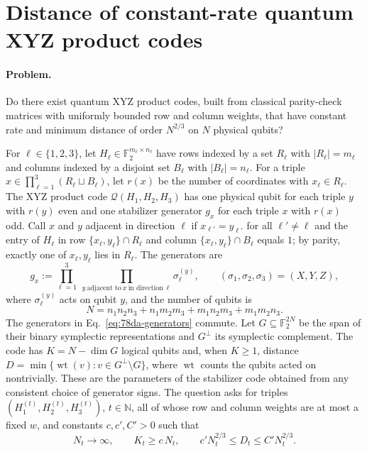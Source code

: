 \section{Distance of constant-rate quantum XYZ product codes}
\label{sec:op_78da2d4fc0735323}

\paragraph{Problem.}
Do there exist quantum XYZ product codes, built from classical parity-check matrices with uniformly bounded row and column weights, that have constant rate and minimum distance of order $N^{2/3}$ on $N$ physical qubits?

For $\ell\in\{1,2,3\}$, let $H_\ell\in\mathbb F_2^{m_\ell\times n_\ell}$ have rows indexed by a set $R_\ell$ with $|R_\ell|=m_\ell$ and columns indexed by a disjoint set $B_\ell$ with $|B_\ell|=n_\ell$. For a triple $x\in\prod_{\ell=1}^{3}(R_\ell\sqcup B_\ell)$, let $r(x)$ be the number of coordinates with $x_\ell\in R_\ell$. The XYZ product code $\mathcal Q(H_1,H_2,H_3)$ has one physical qubit for each triple $y$ with $r(y)$ even and one stabilizer generator $g_x$ for each triple $x$ with $r(x)$ odd. Call $x$ and $y$ adjacent in direction $\ell$ if $x_{\ell'}=y_{\ell'}$ for all $\ell'\neq\ell$ and the entry of $H_\ell$ in row $\{x_\ell,y_\ell\}\cap R_\ell$ and column $\{x_\ell,y_\ell\}\cap B_\ell$ equals $1$; by parity, exactly one of $x_\ell,y_\ell$ lies in $R_\ell$. The generators are
\begin{equation}
  g_x:=\prod_{\ell=1}^{3}\ \prod_{y\ \text{adjacent to}\ x\ \text{in direction}\ \ell}\sigma_\ell^{(y)},
  \qquad(\sigma_1,\sigma_2,\sigma_3)=(X,Y,Z),
  \label{eq:78da-generators}
\end{equation}
where $\sigma_\ell^{(y)}$ acts on qubit $y$, and the number of qubits is
\begin{equation}
  N=n_1n_2n_3+n_1m_2m_3+m_1n_2m_3+m_1m_2n_3.
  \label{eq:78da-qubits}
\end{equation}
The generators in Eq.~\eqref{eq:78da-generators} commute. Let $G\subseteq\mathbb F_2^{2N}$ be the span of their binary symplectic representations and $G^{\perp}$ its symplectic complement. The code has $K=N-\dim G$ logical qubits and, when $K\geq1$, distance $D=\min\{\operatorname{wt}(v):v\in G^{\perp}\setminus G\}$, where $\operatorname{wt}$ counts the qubits acted on nontrivially. These are the parameters of the stabilizer code obtained from any consistent choice of generator signs. The question asks for triples $(H_1^{(t)},H_2^{(t)},H_3^{(t)})$, $t\in\mathbb N$, all of whose row and column weights are at most a fixed $w$, and constants $c,c',C'>0$ such that
\begin{equation}
  N_t\to\infty,\qquad K_t\geq c\,N_t,\qquad c'N_t^{2/3}\leq D_t\leq C'N_t^{2/3}.
  \label{eq:78da-target}
\end{equation}

